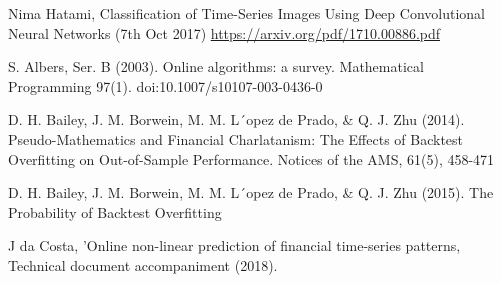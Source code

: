 \documentclass[a4paper,latin]{paper}
\begin{document}
\begin{thebibliography}{9}
Nima Hatami, Classification of Time-Series Images Using Deep Convolutional Neural Networks 
(7th Oct 2017) \url {https://arxiv.org/pdf/1710.00886.pdf}

S. Albers, Ser. B (2003). Online algorithms: a survey. Mathematical Programming 97(1). doi:10.1007/s10107-003-0436-0

D. H. Bailey, J. M. Borwein, M. M. L´opez de Prado, & Q. J. Zhu (2014). Pseudo-Mathematics and Financial Charlatanism: The Effects of Backtest Overfitting on Out-of-Sample Performance. Notices of the AMS, 61(5), 458-471

D. H. Bailey, J. M. Borwein, M. M. L´opez de Prado, & Q. J. Zhu (2015). The Probability of Backtest Overfitting

J da Costa, 'Online non-linear prediction of financial time-series patterns, 
Technical document accompaniment (2018).

\end{thebibliography}
\end{document}
